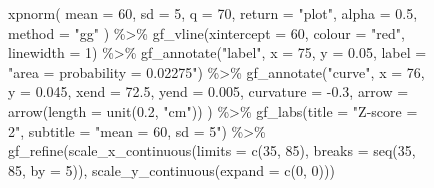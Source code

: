 \documentclass[
  letterpaper,
  DIV=11,
  numbers=noendperiod,
  oneside]{scrartcl}
\newenvironment{Shaded}{\begin{snugshade}}{\end{snugshade}}
\newcommand{\AttributeTok}[1]{\textcolor[rgb]{0.40,0.45,0.13}{#1}}
\newcommand{\DecValTok}[1]{\textcolor[rgb]{0.68,0.00,0.00}{#1}}
\newcommand{\FloatTok}[1]{\textcolor[rgb]{0.68,0.00,0.00}{#1}}
\newcommand{\FunctionTok}[1]{\textcolor[rgb]{0.28,0.35,0.67}{#1}}
\newcommand{\NormalTok}[1]{\textcolor[rgb]{0.00,0.23,0.31}{#1}}
\newcommand{\SpecialCharTok}[1]{\textcolor[rgb]{0.37,0.37,0.37}{#1}}
\newcommand{\StringTok}[1]{\textcolor[rgb]{0.13,0.47,0.30}{#1}}
\begin{document}
\begin{figure}
{\begin{Shaded}
\begin{Highlighting}[]
\FunctionTok{xpnorm}\NormalTok{(}
  \AttributeTok{mean =} \DecValTok{60}\NormalTok{, }\AttributeTok{sd =} \DecValTok{5}\NormalTok{, }\AttributeTok{q =} \DecValTok{70}\NormalTok{, }\AttributeTok{return =} \StringTok{"plot"}\NormalTok{, }\AttributeTok{alpha =} \FloatTok{0.5}\NormalTok{,}
  \AttributeTok{method =} \StringTok{"gg"}
\NormalTok{) }\SpecialCharTok{\%\textgreater{}\%}
  \FunctionTok{gf\_vline}\NormalTok{(}\AttributeTok{xintercept =} \DecValTok{60}\NormalTok{, }\AttributeTok{colour =} \StringTok{"red"}\NormalTok{, }\AttributeTok{linewidth =} \DecValTok{1}\NormalTok{) }\SpecialCharTok{\%\textgreater{}\%}
  \FunctionTok{gf\_annotate}\NormalTok{(}\StringTok{"label"}\NormalTok{, }\AttributeTok{x =} \DecValTok{75}\NormalTok{, }\AttributeTok{y =} \FloatTok{0.05}\NormalTok{, }\AttributeTok{label =} \StringTok{"area = probability = 0.02275"}\NormalTok{) }\SpecialCharTok{\%\textgreater{}\%}
  \FunctionTok{gf\_annotate}\NormalTok{(}\StringTok{"curve"}\NormalTok{,}
    \AttributeTok{x =} \DecValTok{76}\NormalTok{, }\AttributeTok{y =} \FloatTok{0.045}\NormalTok{, }\AttributeTok{xend =} \FloatTok{72.5}\NormalTok{, }\AttributeTok{yend =} \FloatTok{0.005}\NormalTok{,}
    \AttributeTok{curvature =} \SpecialCharTok{{-}}\FloatTok{0.3}\NormalTok{, }\AttributeTok{arrow =} \FunctionTok{arrow}\NormalTok{(}\AttributeTok{length =} \FunctionTok{unit}\NormalTok{(}\FloatTok{0.2}\NormalTok{, }\StringTok{"cm"}\NormalTok{))}
\NormalTok{  ) }\SpecialCharTok{\%\textgreater{}\%}
  \FunctionTok{gf\_labs}\NormalTok{(}\AttributeTok{title =} \StringTok{"Z{-}score = 2"}\NormalTok{, }\AttributeTok{subtitle =} \StringTok{"mean = 60, sd = 5"}\NormalTok{) }\SpecialCharTok{\%\textgreater{}\%}
  \FunctionTok{gf\_refine}\NormalTok{(}\FunctionTok{scale\_x\_continuous}\NormalTok{(}\AttributeTok{limits =} \FunctionTok{c}\NormalTok{(}\DecValTok{35}\NormalTok{, }\DecValTok{85}\NormalTok{), }\AttributeTok{breaks =} \FunctionTok{seq}\NormalTok{(}\DecValTok{35}\NormalTok{, }\DecValTok{85}\NormalTok{, }\AttributeTok{by =} \DecValTok{5}\NormalTok{)), }\FunctionTok{scale\_y\_continuous}\NormalTok{(}\AttributeTok{expand =} \FunctionTok{c}\NormalTok{(}\DecValTok{0}\NormalTok{, }\DecValTok{0}\NormalTok{)))}


\end{Highlighting}
\end{Shaded}}
\end{figure}
\end{document}
